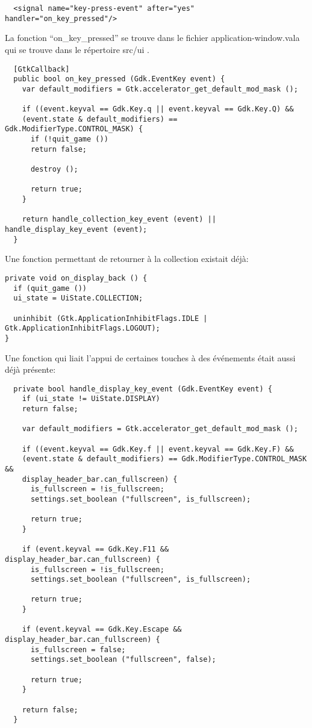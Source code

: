 \documentclass[12pt]{report}
\begin{document}
\begin{verbatim}
  <signal name="key-press-event" after="yes" handler="on_key_pressed"/>
\end{verbatim}

La fonction ``on_key_pressed'' se trouve dans le fichier
application-window.vala qui se trouve dans le répertoire src/ui .

\begin{verbatim}
  [GtkCallback]
  public bool on_key_pressed (Gdk.EventKey event) {
    var default_modifiers = Gtk.accelerator_get_default_mod_mask ();

    if ((event.keyval == Gdk.Key.q || event.keyval == Gdk.Key.Q) &&
    (event.state & default_modifiers) == Gdk.ModifierType.CONTROL_MASK) {
      if (!quit_game ())
      return false;

      destroy ();

      return true;
    }

    return handle_collection_key_event (event) || handle_display_key_event (event);
  }
\end{verbatim}

Une fonction permettant de retourner à la collection existait déjà:

\begin{verbatim}
private void on_display_back () {
  if (quit_game ())
  ui_state = UiState.COLLECTION;

  uninhibit (Gtk.ApplicationInhibitFlags.IDLE | Gtk.ApplicationInhibitFlags.LOGOUT);
}
\end{verbatim}

Une fonction qui liait l'appui de certaines touches à des événements
était aussi déjà présente:

\begin{verbatim}
  private bool handle_display_key_event (Gdk.EventKey event) {
    if (ui_state != UiState.DISPLAY)
    return false;

    var default_modifiers = Gtk.accelerator_get_default_mod_mask ();

    if ((event.keyval == Gdk.Key.f || event.keyval == Gdk.Key.F) &&
    (event.state & default_modifiers) == Gdk.ModifierType.CONTROL_MASK &&
    display_header_bar.can_fullscreen) {
      is_fullscreen = !is_fullscreen;
      settings.set_boolean ("fullscreen", is_fullscreen);

      return true;
    }

    if (event.keyval == Gdk.Key.F11 && display_header_bar.can_fullscreen) {
      is_fullscreen = !is_fullscreen;
      settings.set_boolean ("fullscreen", is_fullscreen);

      return true;
    }

    if (event.keyval == Gdk.Key.Escape && display_header_bar.can_fullscreen) {
      is_fullscreen = false;
      settings.set_boolean ("fullscreen", false);

      return true;
    }
    
    return false;
  }
\end{verbatim}
\end{document}
